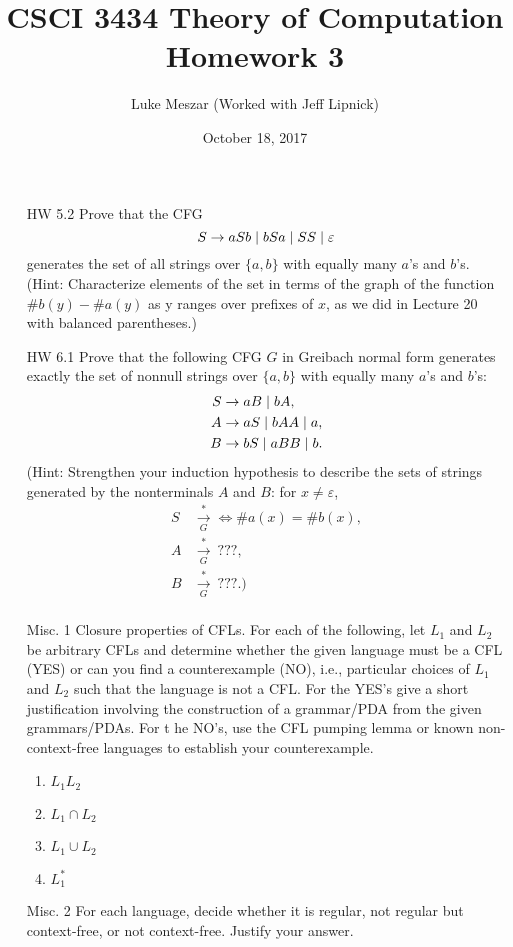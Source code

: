 \documentclass{article}
\title{CSCI 3434 Theory of Computation Homework 3}
\author{Luke Meszar (Worked with Jeff Lipnick)}
\date{October 18, 2017}
\newcommand{\setst}{\hspace{1mm} | \hspace{1mm} }
\renewcommand{\epsilon}{\varepsilon}
\theoremstyle{definition}
\begin{document}
\maketitle
\begin{enumerate}
	\item[HW 5.2]
	Prove that the CFG 
	\[S \rightarrow aSb \setst bSa \setst SS \setst \epsilon\]
	generates the set of all strings over $\{a,b\}$ with equally many $a$'s and $b$'s. (Hint: Characterize elements of the set in terms of the graph of
	the function $\#b(y)-\#a(y)$ as y ranges over prefixes of $x$, as we did
	in Lecture 20 with balanced parentheses.)
	\item[HW 6.1] Prove that the following CFG $G$ in Greibach normal form generates
	exactly the set of nonnull strings over $\{a, b\}$ with equally many $a$'s and
	$b$'s:
	\begin{align*}
	S &\rightarrow aB \setst bA, \\
	A &\rightarrow aS \setst bAA \setst a, \\
	B &\rightarrow bS \setst aBB \setst b.
	\end{align*}
	(Hint: Strengthen your induction hypothesis to describe the sets of
	strings generated by the nonterminals $A$ and $B$: for $x \neq \epsilon$,
	\begin{align*}
	S &\xrightarrow[G]{*} \iff \#a(x) = \#b(x),\\
	A &\xrightarrow[G]{*}\ ???,\\
	B &\xrightarrow[G]{*}\ ???.)\\
	\end{align*}
	\item[Misc. 1]
	Closure properties of CFLs. For each of the following, let $L_1$ and $L_2$ be arbitrary CFLs and determine whether the given language must be a CFL (YES) or can you find a counterexample (NO), i.e., particular choices of $L_1$ and $L_2$ such that the language is not a CFL. For the YES's give a short justification involving the construction of a grammar/PDA from the given grammars/PDAs. For t he NO's, use the CFL pumping lemma or known non-context-free languages to establish your counterexample.
	\begin{enumerate}
		\item $L_1L_2$
		\item $L_1 \cap L_2$
		\item $L_1 \cup L_2$ 
		\item $L_1^*$
	\end{enumerate} 
\item[Misc. 2] For each language, decide whether it is regular, not regular but context-free, or not context-free. Justify your answer. 

\end{enumerate}
\end{document}
